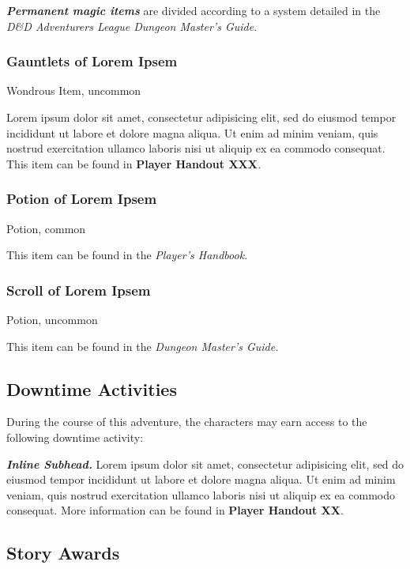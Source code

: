 \emph{\textbf{Permanent magic items}} are divided according to a system
detailed in the \emph{D\&D Adventurers League Dungeon Master's Guide}.

\subsubsection{Gauntlets of Lorem Ipsem}\label{gauntlets-of-lorem-ipsem}

Wondrous Item, uncommon

Lorem ipsum dolor sit amet, consectetur adipisicing elit, sed do eiusmod
tempor incididunt ut labore et dolore magna aliqua. Ut enim ad minim
veniam, quis nostrud exercitation ullamco laboris nisi ut aliquip ex ea
commodo consequat. This item can be found in \textbf{Player Handout
XXX}\emph{.}

\subsubsection{Potion of Lorem Ipsem}\label{potion-of-lorem-ipsem}

Potion, common

This item can be found in the \emph{Player's Handbook.}

\subsubsection{Scroll of Lorem Ipsem}\label{scroll-of-lorem-ipsem}

Potion, uncommon

This item can be found in the \emph{Dungeon Master's Guide.}

\subsection{Downtime Activities}\label{downtime-activities}

During the course of this adventure, the characters may earn access to
the following downtime activity:

\emph{\textbf{Inline Subhead.}} Lorem ipsum dolor sit amet, consectetur
adipisicing elit, sed do eiusmod tempor incididunt ut labore et dolore
magna aliqua. Ut enim ad minim veniam, quis nostrud exercitation ullamco
laboris nisi ut aliquip ex ea commodo consequat. More information can be
found in \textbf{Player Handout XX}.

\subsection{Story Awards}\label{story-awards}

